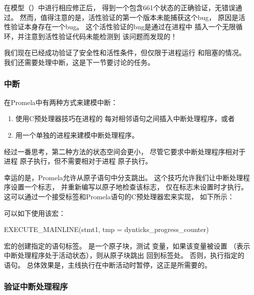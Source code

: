 在模型（）中进行相应修正后，
得到一个包含661个状态的正确验证，无错误通过。
然而，值得注意的是，活性验证的第一个版本未能捕获这个bug，
原因是活性验证本身存在一个bug。
这个活性验证的bug是通过在进程中
插入一个无限循环，并注意到活性验证代码未能检测到
该问题而发现的！

我们现在已经成功验证了安全性和活性条件，但仅限于进程运行
和阻塞的情况。
我们还需要处理中断，这是下一节要讨论的任务。

\subsubsection{中断}
\label{sec:formal:Interrupts}

在Promela中有两种方式来建模中断：
\begin{enumerate}
\item	使用C预处理器技巧在进程的
	每对相邻语句之间插入中断处理程序，或者
\item	用一个单独的进程来建模中断处理程序。
\end{enumerate}

经过一番思考，第二种方法的状态空间会更小，
尽管它要求中断处理程序相对于进程
原子执行，但不需要相对于进程
原子执行。

幸运的是，Promela允许从原子语句中分支跳出。
这个技巧允许我们让中断处理程序设置一个标志，
并重新编写以原子地检查该标志，
仅在标志未设置时才执行。
这可以通过一个接受标签和Promela语句的C预处理器宏来实现，
如下所示：



可以如下使用该宏：

\begin{VerbatimU}
EXECUTE_MAINLINE(stmt1,
                 tmp = dynticks_progress_counter)
\end{VerbatimU}

\begin{fcvref}
宏的创建指定的语句标签。
是一个原子块，测试
变量，如果该变量被设置
（表示中断处理程序处于活动状态），则从原子块跳出
回到标签处。
否则，执行指定的语句。
总体效果是，主线执行在中断活动时暂停，这正是所需要的。
\end{fcvref}

\subsubsection{验证中断处理程序}
\label{sec:formal:Validating Interrupt Handlers}

